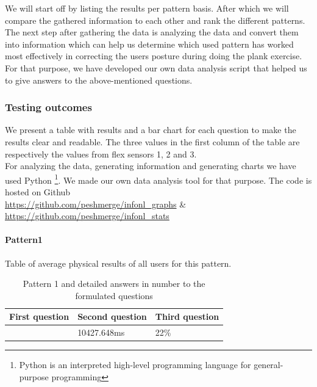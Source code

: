 \documentclass[sigconf]{acmart}
\begin{document}
We will start off by listing the results per pattern basis. After which we will compare the gathered information to each other and rank the different patterns. The next step after gathering the data is analyzing the data and convert them into information which can help us determine which used pattern has worked most effectively in correcting the user\textquotesingle s posture during doing the plank exercise. For that purpose, we have developed our own data analysis script that helped us to give answers to the above{-}mentioned questions. 

\subsubsection{Testing outcomes} 
We present a table with results and a bar chart for each question to make the results clear and readable. The three values in the first column of the table are respectively the values from flex sensors 1, 2 and 3.\\

For analyzing the data, generating information and generating charts we have used Python \footnote{Python is an interpreted high{-}level programming language for general{-}purpose programming}. We made our own data analysis tool for that purpose. 
The code is hosted on Github \\ 
\url{https://github.com/peshmerge/infonl_graphs} \& \\
\url{https://github.com/peshmerge/infonl_stats} 


\paragraph {\textbf{Pattern1}}
Table of average physical results of all users for this pattern.
\begin{table}[h]
\caption{Pattern 1 and detailed answers in number to the formulated questions}
\label{my-label}
\begin{tabular}{|l|l|l|}
\hline
\multicolumn{1}{|c|}{\textbf{First question}} & \multicolumn{1}{c|}{\textbf{Second question}} & \multicolumn{1}{c|}{\textbf{Third question}} \\ \hline
 [43.0,28.0,32.0]& 10427.648ms & 22\%  \\ \hline
\end{tabular}
\end{table}
\end{document}
